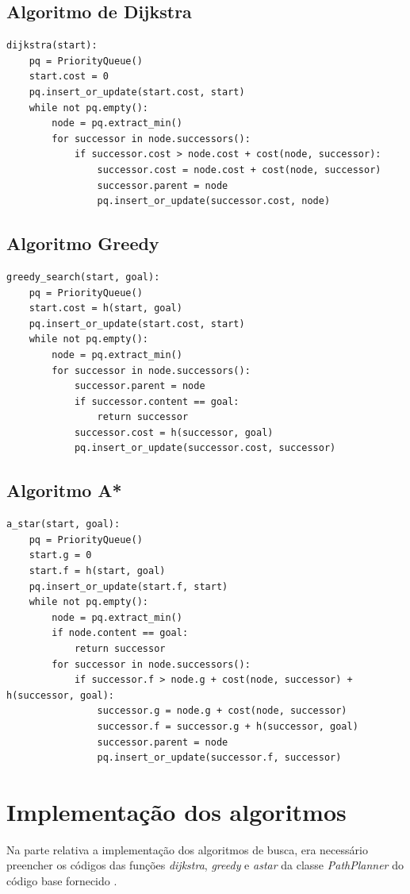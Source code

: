 \documentclass[conference]{IEEEtran}
\begin{document}
\subsection{Algoritmo de Dijkstra}
\begin{lstlisting}
dijkstra(start):
	pq = PriorityQueue()
	start.cost = 0
	pq.insert_or_update(start.cost, start)
	while not pq.empty():
		node = pq.extract_min()
		for successor in node.successors():
			if successor.cost > node.cost + cost(node, successor):
				successor.cost = node.cost + cost(node, successor)
				successor.parent = node
				pq.insert_or_update(successor.cost, node)
\end{lstlisting}

\subsection{Algoritmo Greedy}
\begin{lstlisting}
greedy_search(start, goal):
	pq = PriorityQueue()
	start.cost = h(start, goal)
	pq.insert_or_update(start.cost, start)
	while not pq.empty():
		node = pq.extract_min()
		for successor in node.successors():
			successor.parent = node
			if successor.content == goal:
				return successor
			successor.cost = h(successor, goal)
			pq.insert_or_update(successor.cost, successor)
\end{lstlisting}

\subsection{Algoritmo A*}
\begin{lstlisting}
a_star(start, goal):
	pq = PriorityQueue()
	start.g = 0
	start.f = h(start, goal)
	pq.insert_or_update(start.f, start)
	while not pq.empty():
		node = pq.extract_min()
		if node.content == goal:
			return successor
		for successor in node.successors():
			if successor.f > node.g + cost(node, successor) + h(successor, goal):
				successor.g = node.g + cost(node, successor)
				successor.f = successor.g + h(successor, goal)
				successor.parent = node
				pq.insert_or_update(successor.f, successor)
\end{lstlisting}

\section{Implementação dos algoritmos}
Na parte relativa a implementação dos algoritmos de busca, era necessário preencher os códigos das funções \textit{dijkstra}, \textit{greedy} e \textit{a\underline{\space}star} da classe \textit{PathPlanner} do código base fornecido \cite{b1}.
\end{document}
